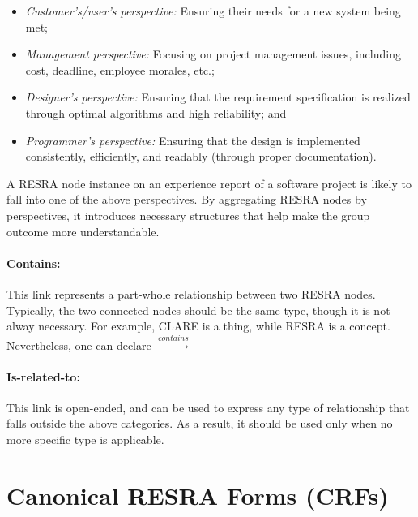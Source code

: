\begin{itemize}
{\begin{itemize}
\item {\it Customer's/user's perspective:\/} Ensuring their needs for a new
  system being met;
  
\item {\it Management perspective:\/} Focusing on project management
  issues, including cost, deadline, employee morales, etc.;
  
\item {\it Designer's perspective:\/} Ensuring that the requirement
  specification is realized through optimal algorithms and high reliability;
  and
  
\item {\it Programmer's perspective:\/} Ensuring that the design is
  implemented consistently, efficiently, and readably (through proper
  documentation).
\end{itemize}

A RESRA node instance on an experience report of a software project is
likely to fall into one of the above perspectives. By aggregating RESRA
nodes by perspectives, it introduces necessary structures that help make
the group outcome more understandable.


\paragraph{Contains:}

This link represents a part-whole relationship between two RESRA nodes.
Typically, the two connected nodes should be the same type, though it is
not alway necessary. For example, CLARE is a {\sf thing\/}, while {\sf
RESRA\/} is a {\sf concept\/}. Nevertheless, one can declare  \( \stackrel{contains}{\longrightarrow} \) 

\paragraph{Is-related-to:}

This link is open-ended, and can be used to express any type of
relationship that falls outside the above categories. As a result, it
should be used only when no more specific type is applicable.



\section{Canonical RESRA Forms (CRFs)}
\label{sec:crf}

}
\end{itemize}
